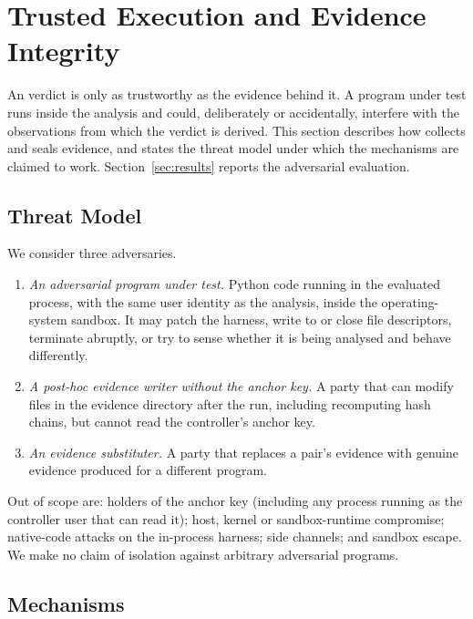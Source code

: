 \section{Trusted Execution and Evidence Integrity}\label{sec:trust}

An \NDO{} verdict is only as trustworthy as the evidence behind it. A program under test runs inside the analysis and could, deliberately or accidentally, interfere with the observations from which the verdict is derived. This section describes how \sbg{} collects and seals evidence, and states the threat model under which the mechanisms are claimed to work. Section~\ref{sec:results} reports the adversarial evaluation.

\subsection{Threat Model}
We consider three adversaries.
\begin{enumerate}
\item[A1)] \emph{An adversarial program under test.} Python code running in the evaluated process, with the same user identity as the analysis, inside the operating-system sandbox. It may patch the harness, write to or close file descriptors, terminate abruptly, or try to sense whether it is being analysed and behave differently.
\item[A2)] \emph{A post-hoc evidence writer without the anchor key.} A party that can modify files in the evidence directory after the run, including recomputing hash chains, but cannot read the controller's anchor key.
\item[A3)] \emph{An evidence substituter.} A party that replaces a pair's evidence with genuine evidence produced for a different program.
\end{enumerate}
Out of scope are: holders of the anchor key (including any process running as the controller user that can read it); host, kernel or sandbox-runtime compromise; native-code attacks on the in-process harness; side channels; and sandbox escape. We make no claim of isolation against arbitrary adversarial programs.

\subsection{Mechanisms}
